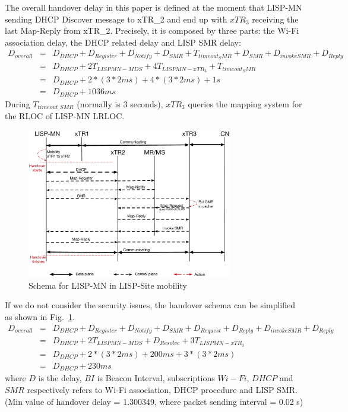 The overall handover delay in this paper is defined at the moment that LISP-MN sending DHCP Discover message to xTR\_2 and end up with $xTR_3$ receiving the last Map-Reply from xTR\_2. Precisely, it is composed by three parts: the Wi-Fi association delay, the DHCP related delay and LISP SMR delay:
\begin{eqnarray}
D_{overall} &=& D_{DHCP} + D_{Register} + D_{Notify} + D_{SMR} + T_{timeout_SMR} + D_{SMR} + D_{invokeSMR} + D_{Reply} \nonumber \\
&=& D_{DHCP} + 2T_{LISPMN-MDS} + 4T_{LISPMN-xTR_3} + T_{timeout_SMR}\nonumber \\
&=& D_{DHCP} + 2* (3*2ms) + 4*(3*2ms) + 1s\nonumber \\
&=& D_{DHCP} + 1036 ms
\end{eqnarray}
During $T_{timeout\_SMR}$ (normally is 3 seconds), $xTR_3$ queries the mapping system for the RLOC of LISP-MN LRLOC.

\begin{figure}[!th]
	\centering
	\includegraphics[width=0.8\textwidth]{Pics/Mobility_double_encap_schema_SMR_improving_simplify}
	\caption{Schema for LISP-MN in LISP-Site mobility}
	\label{Mobility_double_encap_schema_SMR_improving_simplify}
\end{figure}
If we do not consider the security issues, the handover schema can be simplified as shown in Fig.~\ref{Mobility_double_encap_schema_SMR_improving_simplify}.
\begin{eqnarray}
	D_{overall} &=& D_{DHCP} + D_{Register} + D_{Notify} + D_{SMR} + D_{Request} + D_{Reply} + D_{invokeSMR} + D_{Reply} \nonumber \\
	&=& D_{DHCP} + 2T_{LISPMN-MDS} + D_{Resolve} + 3T_{LISPMN-xTR_3} \nonumber \\
	&=& D_{DHCP} + 2* (3*2ms) + 200ms + 3*(3*2ms) \nonumber \\
	&=& D_{DHCP} + 230 ms
\end{eqnarray}
where $D$ is the delay, $BI$ is Beacon Interval, subscriptions $Wi-Fi$, $DHCP$ and $SMR$ respectively refers to Wi-Fi association, DHCP procedure and LISP SMR. (Min value of handover delay = 1.300349, where packet sending interval = 0.02 s) 

